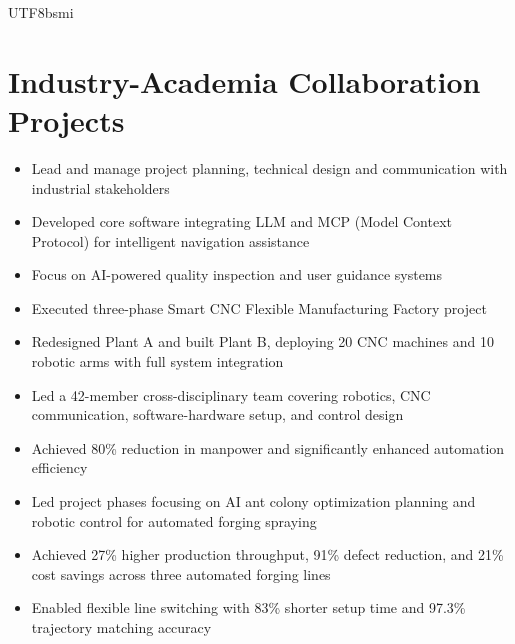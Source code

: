 \documentclass[11pt,a4paper,sans]{moderncv}
\begin{document}
\begin{CJK}{UTF8}{bsmi}
\section{Industry-Academia Collaboration Projects}

{
\begin{itemize}
\item Lead and manage project planning, technical design and communication with industrial stakeholders
\item Developed core software integrating LLM and MCP (Model Context Protocol) for intelligent navigation assistance
\item Focus on AI-powered quality inspection and user guidance systems
\end{itemize}
}

{
\begin{itemize}
\item Executed three-phase Smart CNC Flexible Manufacturing Factory project
\item Redesigned Plant A and built Plant B, deploying 20 CNC machines and 10 robotic arms with full system integration
\item Led a 42-member cross-disciplinary team covering robotics, CNC communication, software-hardware setup, and control design
\item Achieved 80\% reduction in manpower and significantly enhanced automation efficiency
\end{itemize}
}

{
\begin{itemize}
\item Led project phases focusing on AI ant colony optimization planning and robotic control for automated forging spraying
\item Achieved 27\% higher production throughput, 91\% defect reduction, and 21\% cost savings across three automated forging lines
\item Enabled flexible line switching with 83\% shorter setup time and 97.3\% trajectory matching accuracy
\end{itemize}
}


\end{CJK}
\end{document}
